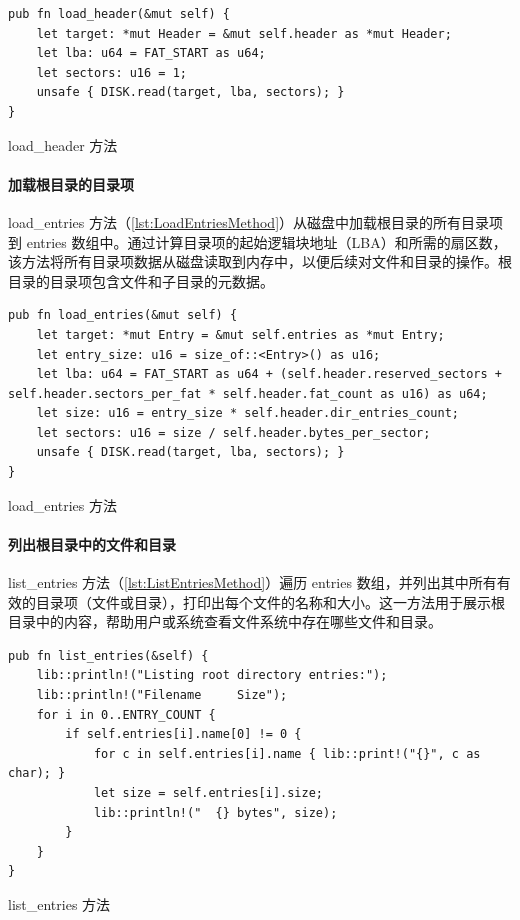 \begin{listing}[htbp]
    \begin{verbatim}
pub fn load_header(&mut self) {
    let target: *mut Header = &mut self.header as *mut Header;
    let lba: u64 = FAT_START as u64;
    let sectors: u16 = 1;
    unsafe { DISK.read(target, lba, sectors); }
}
    \end{verbatim}
    \caption{load\_header 方法}\label{lst:LoadHeaderMethod}
\end{listing}

\paragraph{加载根目录的目录项}

load\_entries 方法（\cref{lst:LoadEntriesMethod}）从磁盘中加载根目录的所有目录项到 entries 数组中。通过计算目录项的起始逻辑块地址（LBA）和所需的扇区数，该方法将所有目录项数据从磁盘读取到内存中，以便后续对文件和目录的操作。根目录的目录项包含文件和子目录的元数据。

\begin{listing}[htbp]
    \begin{verbatim}
pub fn load_entries(&mut self) {
    let target: *mut Entry = &mut self.entries as *mut Entry;
    let entry_size: u16 = size_of::<Entry>() as u16;
    let lba: u64 = FAT_START as u64 + (self.header.reserved_sectors + self.header.sectors_per_fat * self.header.fat_count as u16) as u64;
    let size: u16 = entry_size * self.header.dir_entries_count;
    let sectors: u16 = size / self.header.bytes_per_sector;
    unsafe { DISK.read(target, lba, sectors); }
}
    \end{verbatim}
    \caption{load\_entries 方法}\label{lst:LoadEntriesMethod}
\end{listing}

\paragraph{列出根目录中的文件和目录}

list\_entries 方法（\cref{lst:ListEntriesMethod}）遍历 entries 数组，并列出其中所有有效的目录项（文件或目录），打印出每个文件的名称和大小。这一方法用于展示根目录中的内容，帮助用户或系统查看文件系统中存在哪些文件和目录。

\begin{listing}[htbp]
    \begin{verbatim}
pub fn list_entries(&self) {
    lib::println!("Listing root directory entries:");
    lib::println!("Filename     Size");
    for i in 0..ENTRY_COUNT {
        if self.entries[i].name[0] != 0 {
            for c in self.entries[i].name { lib::print!("{}", c as char); }
            let size = self.entries[i].size;
            lib::println!("  {} bytes", size);
        }
    }
}
    \end{verbatim}
    \caption{list\_entries 方法}\label{lst:ListEntriesMethod}
\end{listing}

